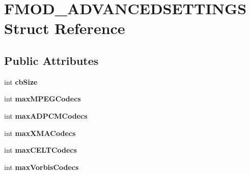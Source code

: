 \hypertarget{struct_f_m_o_d___a_d_v_a_n_c_e_d_s_e_t_t_i_n_g_s}{\section{F\+M\+O\+D\+\_\+\+A\+D\+V\+A\+N\+C\+E\+D\+S\+E\+T\+T\+I\+N\+G\+S Struct Reference}
\label{struct_f_m_o_d___a_d_v_a_n_c_e_d_s_e_t_t_i_n_g_s}
}
\subsection*{Public Attributes}
\begin{DoxyCompactItemize}
\item 
\hypertarget{struct_f_m_o_d___a_d_v_a_n_c_e_d_s_e_t_t_i_n_g_s_a262522129ac6c602b391138ba69659b9}{int {\bfseries cb\+Size}}\label{struct_f_m_o_d___a_d_v_a_n_c_e_d_s_e_t_t_i_n_g_s_a262522129ac6c602b391138ba69659b9}

\item 
\hypertarget{struct_f_m_o_d___a_d_v_a_n_c_e_d_s_e_t_t_i_n_g_s_a961b0224b4e3cfe7e0cc3a3ec5d2ca8c}{int {\bfseries max\+M\+P\+E\+G\+Codecs}}\label{struct_f_m_o_d___a_d_v_a_n_c_e_d_s_e_t_t_i_n_g_s_a961b0224b4e3cfe7e0cc3a3ec5d2ca8c}

\item 
\hypertarget{struct_f_m_o_d___a_d_v_a_n_c_e_d_s_e_t_t_i_n_g_s_acfa5560db4bc9fd518a1c5f1f02bf5c9}{int {\bfseries max\+A\+D\+P\+C\+M\+Codecs}}\label{struct_f_m_o_d___a_d_v_a_n_c_e_d_s_e_t_t_i_n_g_s_acfa5560db4bc9fd518a1c5f1f02bf5c9}

\item 
\hypertarget{struct_f_m_o_d___a_d_v_a_n_c_e_d_s_e_t_t_i_n_g_s_aa0f823d02c14ef5fff96d882aa5fc1af}{int {\bfseries max\+X\+M\+A\+Codecs}}\label{struct_f_m_o_d___a_d_v_a_n_c_e_d_s_e_t_t_i_n_g_s_aa0f823d02c14ef5fff96d882aa5fc1af}

\item 
\hypertarget{struct_f_m_o_d___a_d_v_a_n_c_e_d_s_e_t_t_i_n_g_s_a7e3a2cc0a48d3219bd262c7671e52fc6}{int {\bfseries max\+C\+E\+L\+T\+Codecs}}\label{struct_f_m_o_d___a_d_v_a_n_c_e_d_s_e_t_t_i_n_g_s_a7e3a2cc0a48d3219bd262c7671e52fc6}

\item 
\hypertarget{struct_f_m_o_d___a_d_v_a_n_c_e_d_s_e_t_t_i_n_g_s_a22c9c6e32dd68468537741e6cfc4888f}{int {\bfseries max\+Vorbis\+Codecs}}\label{struct_f_m_o_d___a_d_v_a_n_c_e_d_s_e_t_t_i_n_g_s_a22c9c6e32dd68468537741e6cfc4888f}


\end{DoxyCompactItemize}
